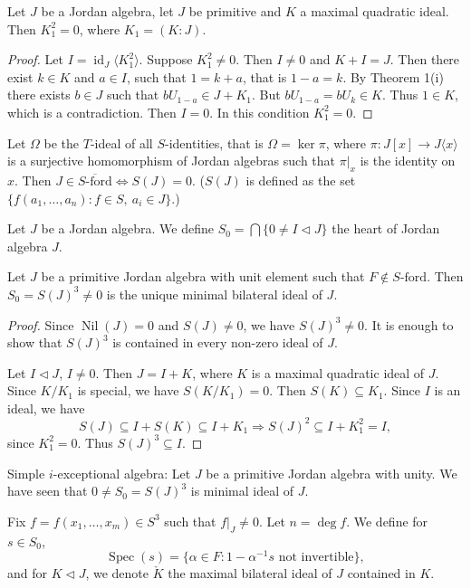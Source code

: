 \documentclass{article}
\begin{document}
\begin{lemma}
Let $J$ be a Jordan algebra, let $J$ be primitive and $K$ a maximal quadratic ideal. Then $K_1^2=0$, where $K_1=(K:J)$.
\end{lemma}

\begin{proof}
Let $I=\operatorname{id}_J\langle K_1^2\rangle$. Suppose $K_1^2\neq0$. Then $I\neq0$ and $K+I=J$. Then there exist $k\in K$ and $a\in I$, such that $1=k+a$, that is $1-a=k$. By Theorem 1(i) there exists $b\in J$ such that $bU_{1-a}\in J+K_1$. But $bU_{1-a}=bU_k\in K$. Thus $1\in K$, which is a contradiction. Then $I=0$. In this condition $K_1^2=0$.
\end{proof}

Let $\Omega$ be the $T$-ideal of all $S$-identities, that is $\Omega=\ker\pi$, where $\pi:J[x]\to J\langle x\rangle$ is a surjective homomorphism of Jordan algebras such that $\pi|_x$ is the identity on $x$. Then $J\in\overline{S\text{-ford}}\Longleftrightarrow S(J)=0$. ($S(J)$ is defined as the set $\{f(a_1,\dots,a_n):f\in S,\ a_i\in J\}$.)

\begin{definition}
Let $J$ be a Jordan algebra. We define $S_0=\bigcap\{0\neq I\triangleleft J\}$ the heart of Jordan algebra $J$.
\end{definition}

\begin{lemma}
Let $J$ be a primitive Jordan algebra with unit element such that $F\notin S\text{-ford}$. Then $S_0=S(J)^3\neq0$ is the unique minimal bilateral ideal of $J$.
\end{lemma}

\begin{proof}
Since $\operatorname{Nil}(J)=0$ and $S(J)\neq0$, we have $S(J)^3\neq0$. It is enough to show that $S(J)^3$ is contained in every non-zero ideal of $J$.

Let $I\triangleleft J$, $I\neq0$. Then $J=I+K$, where $K$ is a maximal quadratic ideal of $J$. Since $K/K_1$ is special, we have $S(K/K_1)=0$. Then $S(K)\subseteq K_1$. Since $I$ is an ideal, we have
\[
S(J)\subseteq I+S(K)\subseteq I+K_1\Rightarrow S(J)^2\subseteq I+K_1^2=I,
\]
since $K_1^2=0$. Thus $S(J)^3\subseteq I$.
\end{proof}

Simple $i$-exceptional algebra: Let $J$ be a primitive Jordan algebra with unity. We have seen that $0\neq S_0=S(J)^3$ is minimal ideal of $J$.

Fix $f=f(x_1,\dots,x_m)\in S^3$ such that $f|_J\neq0$. Let $n=\deg f$. We define for $s\in S_0$,
\[
\operatorname{Spec}(s)=\{\alpha\in F:1-\alpha^{-1}s\text{ not invertible}\},
\]
and for $K\triangleleft J$, we denote $\check{K}$ the maximal bilateral ideal of $J$ contained in $K$.
\end{document}
